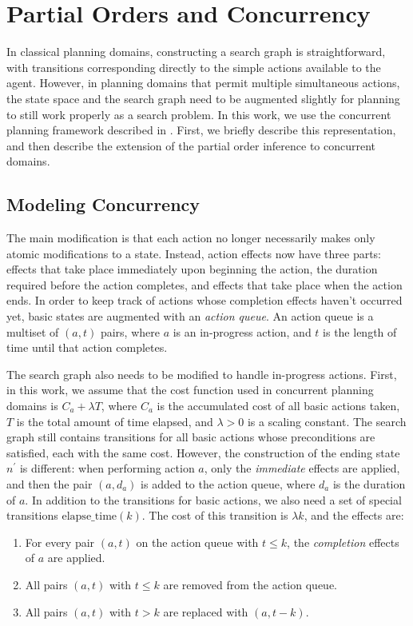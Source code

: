 \documentclass[letterpaper]{article}
\theoremstyle{plain} \newtheorem{theorem}{Theorem} \newtheorem{proposition}{Proposition} \newtheorem{lemma}{Lemma}
\theoremstyle{definition} \newtheorem{definition}{Definition} \newtheorem{conjecture}{Conjecture} \newtheorem*{example}{Example}
\theoremstyle{remark} \newtheorem*{remark}{Remark} \newtheorem*{note}{Note} \newtheorem{case}{Case}
\begin{document}
\section{Partial Orders and Concurrency} 

In classical planning domains, constructing a search graph is
straightforward, with transitions corresponding directly to the
simple actions available to the agent. However, in planning domains
that permit multiple simultaneous actions, the state space and the
search graph need to be augmented slightly for planning to still
work properly as a search problem. In this work, we use the concurrent planning framework described in
\citet{bacchus2001planning}.
First, we briefly describe this representation, and then describe
the extension of the partial order inference to concurrent domains.

\subsection{Modeling Concurrency}

The main modification is that each action no longer necessarily
makes only atomic modifications to a state. Instead, action effects
now have three parts: effects that take place immediately upon
beginning the action, the duration required before the action
completes, and effects that take place when the action ends. In
order to keep track of actions whose completion effects haven't
occurred yet, basic states are augmented with an \emph{action queue}.
An action queue is a multiset of $(a, t)$ pairs, where $a$ is an
in-progress action, and $t$ is the length of time until that action
completes.

The search graph also needs to be modified to handle in-progress actions. First, 
in this work, we assume that the cost function used in concurrent planning domains is
$C_a + \lambda T$, where $C_a$ is the accumulated cost of all basic actions taken, $T$ is
the total amount of time elapsed, and $\lambda > 0$ is a scaling constant. The search graph still contains transitions for all
basic actions whose preconditions are satisfied, each with the same cost. However, the
construction of the ending state $n^\prime$ is different: when performing action $a$, only the
\emph{immediate} effects are applied, and then the pair $(a, d_a)$ is added to the action
queue, where $d_a$ is the duration of $a$. 
In addition to the transitions for basic actions, we also need a set of special transitions
$\mathrm{elapse\_time}(k)$. The cost of this transition is $\lambda k$, and the effects are: 
\begin{enumerate}
	\item For every pair $(a, t)$ on the action queue with $t \le k$, the \emph{completion} effects of $a$ are applied.
	\item All pairs $(a, t)$ with $t \le k$ are removed from the action queue.
	\item All pairs $(a, t)$ with $t > k$ are replaced with $(a, t-k)$.
\end{enumerate}
\end{document}

